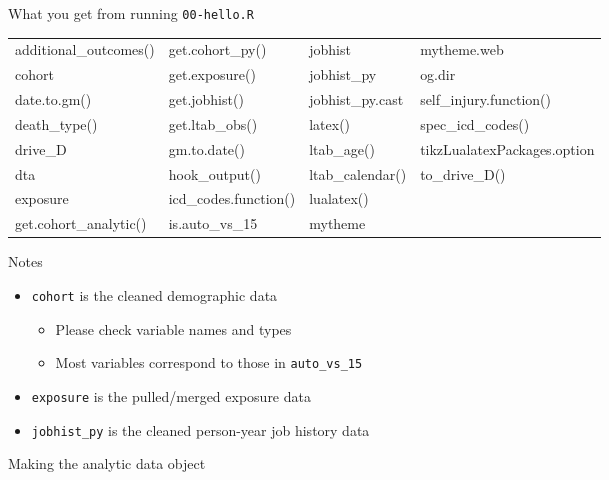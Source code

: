 \documentclass[
  ignorenonframetext,
  aspectratio=169,
]{beamer}
\providecommand{\tightlist}{%
  \setlength{\itemsep}{0pt}\setlength{\parskip}{0pt}}
\begin{document}
\begin{frame}[fragile]{What you get from running \texttt{00-hello.R}}
\protect\hypertarget{what-you-get-from-running-00-hello.r}{}

\begin{center}\begin{adjustbox}{max width = 0.85\linewidth}\ttfamily
\begin{tabular}{llll}
  \toprule
additional\_outcomes() & get.cohort\_py() & jobhist & mytheme.web \\ 
  cohort & get.exposure() & jobhist\_py & og.dir \\ 
  date.to.gm() & get.jobhist() & jobhist\_py.cast & self\_injury.function() \\ 
  death\_type() & get.ltab\_obs() & latex() & spec\_icd\_codes() \\ 
  drive\_D & gm.to.date() & ltab\_age() & tikzLualatexPackages.option \\ 
  dta & hook\_output() & ltab\_calendar() & to\_drive\_D() \\ 
  exposure & icd\_codes.function() & lualatex()  \\ 
  get.cohort\_analytic() & is.auto\_vs\_15 & mytheme  \\ 
   \bottomrule
\end{tabular}
\end{adjustbox}\end{center}

Notes

\begin{itemize}
\tightlist
\item
  \texttt{cohort} is the cleaned demographic data

  \begin{itemize}
  \tightlist
  \item
    Please check variable names and types
  \item
    Most variables correspond to those in \texttt{auto\_vs\_15}
  \end{itemize}
\item
  \texttt{exposure} is the pulled/merged exposure data
\item
  \texttt{jobhist\_py} is the cleaned person-year job history data
\end{itemize}

\end{frame}

\begin{frame}{Making the analytic data object}
\protect\hypertarget{making-the-analytic-data-object}{}

\end{frame}
\end{document}

